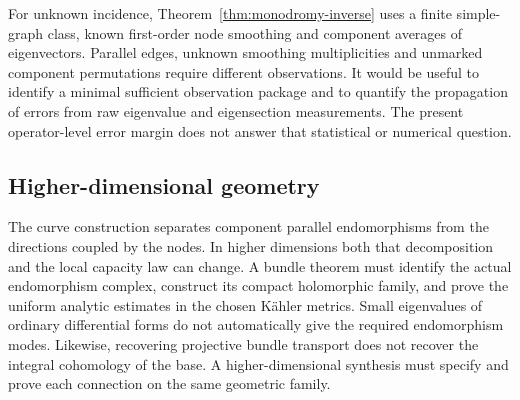 For unknown incidence,
Theorem~\ref{thm:monodromy-inverse} uses a finite
simple-graph class, known first-order node
smoothing and component averages of eigenvectors.
Parallel edges, unknown smoothing multiplicities
and unmarked component permutations require
different observations. It would be useful to
identify a minimal sufficient observation package
and to quantify the propagation of errors from
raw eigenvalue and eigensection measurements.
The present operator-level error margin does not
answer that statistical or numerical question.

\subsection{Higher-dimensional geometry}
The curve construction separates component
parallel endomorphisms from the directions
coupled by the nodes. In higher dimensions
both that decomposition and the local capacity
law can change. A bundle theorem must identify
the actual endomorphism complex, construct its
compact holomorphic family, and prove the
uniform analytic estimates in the chosen
Kähler metrics. Small eigenvalues of ordinary
differential forms do not automatically give
the required endomorphism modes.
Likewise, recovering projective bundle transport
does not recover the integral cohomology of
the base. A higher-dimensional synthesis must
specify and prove each connection on the same
geometric family.
